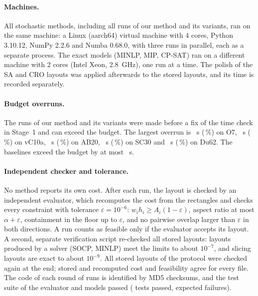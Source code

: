 \paragraph{Machines.} All stochastic methods, including all runs of our method and its variants, ran on the same
machine: a Linux (aarch64) virtual machine with 4 cores, Python 3.10.12, NumPy 2.2.6 and Numba 0.68.0, with three
runs in parallel, each as a separate process. The exact models (MINLP, MIP, CP-SAT) ran on a different machine with 2 cores
(Intel Xeon, 2.8~GHz), one run at a time. The polish of the SA and CRO layouts was applied afterwards to the stored
layouts, and its time is recorded separately.

\paragraph{Budget overruns.} The runs of our method and its variants were made before a fix of the time check
in Stage~1 and can exceed the budget. The largest overrun is \bxOverOursMaxSOseven~s (\bxOverOursMaxPctOseven\,\%) on
O7, \bxOverOursMaxSvCtena~s (\bxOverOursMaxPctvCtena\,\%) on vC10a, \bxOverOursMaxSABtwenty~s
(\bxOverOursMaxPctABtwenty\,\%) on AB20, \bxOverOursMaxSSCthirty~s (\bxOverOursMaxPctSCthirty\,\%) on SC30 and
\bxOverOursMaxSDusixtytwo~s (\bxOverOursMaxPctDusixtytwo\,\%) on Du62. The baselines exceed the budget by at most
\bxOverBaseMaxS~s.

\paragraph{Independent checker and tolerance.} No method reports its own cost. After each run, the layout is
checked by an independent evaluator, which recomputes the cost from the rectangles and checks every constraint
with tolerance $\varepsilon=10^{-6}$: $w_ih_i\ge A_i(1-\varepsilon)$, aspect ratio at most $\alpha+\varepsilon$,
containment in the floor up to $\varepsilon$, and no pairwise overlap larger than $\varepsilon$ in both
directions. A run counts as feasible only if the evaluator accepts its layout. A second, separate verification
script re-checked all stored layouts: layouts produced by a solver (SOCP, MINLP) meet the limits to about $10^{-7}$,
and slicing layouts are exact to about $10^{-9}$. All \bxNlayouts{} stored layouts of the protocol were checked
again at the end; stored and recomputed cost and feasibility agree for every file. The code of each round of
runs is identified by MD5 checksums, and the test suite of the evaluator and models passed
(\bxTestsPassed{} tests passed, \bxTestsXfail{} expected failures).


